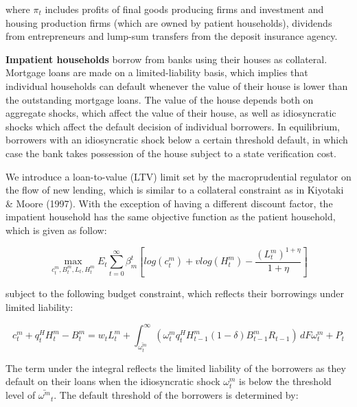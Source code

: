 \documentclass[12pt]{article}
\numberwithin{equation}{section}
\begin{document}
where $\pi_{t}$ includes profits of final goods producing firms and investment and housing production firms (which are owned by patient households), dividends from entrepreneurs and lump-sum transfers from the deposit insurance agency. 



\noindent
\textbf{Impatient households} borrow from banks using their houses as collateral. Mortgage loans are made on a limited-liability basis, which implies that individual households can default whenever the value of their house is lower than the outstanding mortgage loans. The value of the house depends both on aggregate shocks, which affect the value of their house, as well as idiosyncratic shocks which affect the default decision of individual borrowers. In equilibrium, borrowers with an idiosyncratic shock below a certain threshold default, in which case the bank takes possession of the house subject to a state verification cost.

We introduce a loan-to-value (LTV) limit set by the macroprudential regulator on the flow of new lending, which is similar to a collateral constraint as in Kiyotaki \& Moore (1997). With the exception of having a different discount factor, the impatient household has the same objective function as the patient household, which is given as follow: 

\begin{equation}
\max_{c^m_t,B^m_t,L_{t},H^m_t}E_t\sum _{t=0}^{\infty } \beta^t_{m} [log(c^m_t)+vlog(H^m_t)-\frac{(L^m_t)^{1+\eta}}{1+\eta} ]
\end{equation}

subject to the following budget constraint, which reflects their borrowings under limited liability: 

\begin{equation}
c^m_t+q^H_{t}H^m_{t} -B^m_{t}=w_{t}L^m_{t}+\int_{\bar{\omega^m_{t} }}^\infty  \left(\omega^m_{t} q^H_{t} H^m_{t-1} (1-\delta)B^m_{t-1}R_{t-1}\right) \, dF\omega^m_{t} + P_{t}
\end{equation}

The term under the integral reflects the limited liability of the borrowers as they default on their loans when the idiosyncratic shock $\omega^m_{t}$ is below the threshold level of $\bar{\omega^m}_t$. The default threshold of the borrowers is determined by: 
\end{document}
